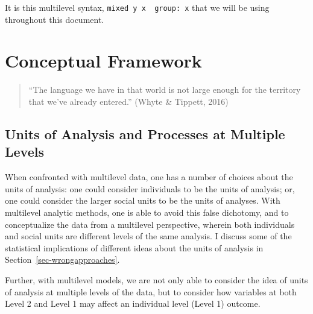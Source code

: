 \documentclass[
  letterpaper,
  DIV=11,
  numbers=noendperiod]{scrreprt}
\begin{document}
It is this multilevel syntax,
\texttt{mixed\ y\ x\ \textbar{}\textbar{}\ group:\ x} that we will be
using throughout this document.


\hypertarget{sec-conceptualframework}{%
\chapter{Conceptual Framework}\label{sec-conceptualframework}}

\begin{quote}
``The language we have in that world is not large enough for the
territory that we've already entered.'' (Whyte \& Tippett, 2016)
\end{quote}

\hypertarget{units-of-analysis-and-processes-at-multiple-levels}{%
\section{Units of Analysis and Processes at Multiple
Levels}\label{units-of-analysis-and-processes-at-multiple-levels}}

When confronted with multilevel data, one has a number of choices about
the units of analysis: one could consider individuals to be the units of
analysis; or, one could consider the larger social units to be the units
of analyses. With multilevel analytic methods, one is able to avoid this
false dichotomy, and to conceptualize the data from a multilevel
perspective, wherein both individuals and social units are different
levels of the same analysis. I discuss some of the statistical
implications of different ideas about the units of analysis in
Section~\ref{sec-wrongapproaches}.

Further, with multilevel models, we are not only able to consider the
idea of units of analysis at multiple levels of the data, but to
consider how variables at both Level 2 and Level 1 may affect an
individual level (Level 1) outcome.
\end{document}
